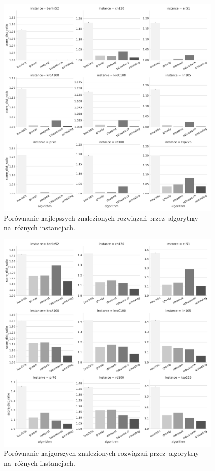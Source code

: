 \begin{figure}[H]
\begin{center}
\includegraphics[width=1.0\textwidth]{graphs/score_comparison_bar_min.pdf}
\end{center}
\caption{Porównanie najlepszych znalezionych rozwiązań przez~algorytmy na~różnych instancjach.}
\label{fig:best}
\end{figure}

\begin{figure}[H]
\begin{center}
\includegraphics[width=1.0\textwidth]{graphs/score_comparison_bar_max.pdf}
\end{center}
\caption{Porównanie najgorszych znalezionych rozwiązań przez~algorytmy na~różnych instancjach.}
\label{fig:worst}
\end{figure}

